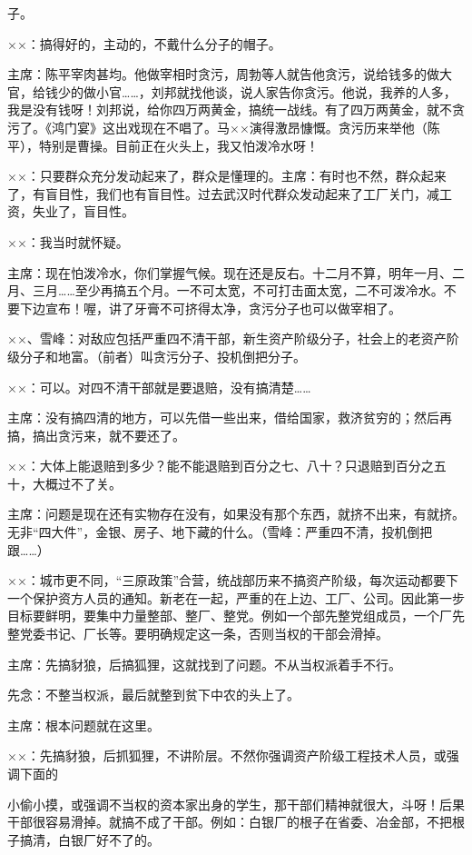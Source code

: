 子。

××：搞得好的，主动的，不戴什么分子的帽子。

主席：陈平宰肉甚均。他做宰相时贪污，周勃等人就告他贪污，说给钱多的做大官，给钱少的做小官……，刘邦就找他谈，说人家告你贪污。他说，我养的人多，我是没有钱呀！刘邦说，给你四万两黄金，搞统一战线。有了四万两黄金，就不贪污了。《鸿门宴》这出戏现在不唱了。马××演得激昂慷慨。贪污历来举他（陈平），特别是曹操。目前正在火头上，我又怕泼冷水呀！

××：只要群众充分发动起来了，群众是懂理的。主席：有时也不然，群众起来了，有盲目性，我们也有盲目性。过去武汉时代群众发动起来了工厂关门，减工资，失业了，盲目性。

××：我当时就怀疑。

主席：现在怕泼冷水，你们掌握气候。现在还是反右。十二月不算，明年一月、二月、三月……至少再搞五个月。一不可太宽，不可打击面太宽，二不可泼冷水。不要下边宣布！喔，讲了牙膏不可挤得太净，贪污分子也可以做宰相了。

××、雪峰：对敌应包括严重四不清干部，新生资产阶级分子，社会上的老资产阶级分子和地富。（前者）叫贪污分子、投机倒把分子。

××：可以。对四不清干部就是要退赔，没有搞清楚……

主席：没有搞四清的地方，可以先借一些出来，借给国家，救济贫穷的；然后再搞，搞出贪污来，就不要还了。

××：大体上能退赔到多少？能不能退赔到百分之七、八十？只退赔到百分之五十，大概过不了关。

主席：问题是现在还有实物存在没有，如果没有那个东西，就挤不出来，有就挤。无非“四大件”，金银、房子、地下藏的什么。（雪峰：严重四不清，投机倒把跟……）

××：城市更不同，“三原政策”合营，统战部历来不搞资产阶级，每次运动都要下一个保护资方人员的通知。新老在一起，严重的在上边、工厂、公司。因此第一步目标要鲜明，要集中力量整部、整厂、整党。例如一个部先整党组成员，一个厂先整党委书记、厂长等。要明确规定这一条，否则当权的干部会滑掉。

主席：先搞豺狼，后搞狐狸，这就找到了问题。不从当权派着手不行。

先念：不整当权派，最后就整到贫下中农的头上了。

主席：根本问题就在这里。

××：先搞豺狼，后抓狐狸，不讲阶层。不然你强调资产阶级工程技术人员，或强调下面的

小偷小摸，或强调不当权的资本家出身的学生，那干部们精神就很大，斗呀！后果干部很容易滑掉。就搞不成了干部。例如：白银厂的根子在省委、冶金部，不把根子搞清，白银厂好不了的。

